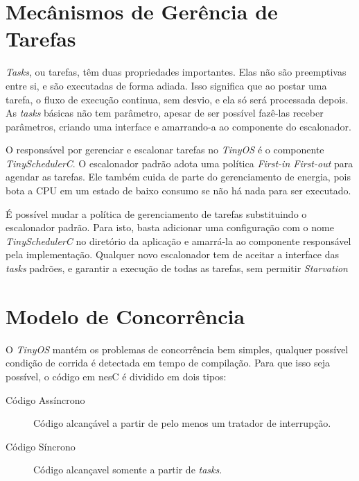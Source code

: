 \documentclass[a4paper,onecolumn, 10pt]{article}
\begin{document}

\section{Mecânismos de Gerência de Tarefas}\label{mecanismosdegerencia}
\textit{Tasks}, ou tarefas, têm duas propriedades importantes. Elas não são preemptivas entre si, e são executadas de forma adiada. Isso significa que ao postar uma tarefa, o fluxo de execução continua, sem desvio, e ela só será processada depois. As \textit{tasks} básicas não tem parâmetro, apesar de ser possível fazê-las receber parâmetros, criando uma interface e amarrando-a ao componente do escalonador.

O responsável por gerenciar e escalonar tarefas no \textit{TinyOS} é o componente \textit{TinySchedulerC}. O escalonador padrão adota uma política \textit{First-in First-out} para agendar as tarefas. Ele também cuida de parte do gerenciamento de energia, pois bota a CPU em um estado de baixo consumo se não há nada para ser executado.

É possível mudar a política de gerenciamento de tarefas substituindo o escalonador padrão. Para isto, basta adicionar uma configuração com o nome \textit{TinySchedulerC} no diretório da aplicação e amarrá-la ao componente responsável pela implementação. Qualquer novo escalonador tem de aceitar a interface das \textit{tasks} padrões, e garantir a execução de todas as tarefas, sem permitir \textit{Starvation}


\section{Modelo de Concorrência}\label{modelodeconcorrencia}
O \textit{TinyOS} mantém os problemas de concorrência bem simples, qualquer possível condição de corrida é detectada em tempo de compilação. Para que isso seja possível, o código em nesC é dividido em dois tipos:
\begin{description}
  \item[Código Assíncrono]
  Código alcançável a partir de pelo menos um tratador de interrupção.
  \item[Código Síncrono]
  Código alcançavel somente a partir de \textit{tasks}.
\end{description}
\end{document}
